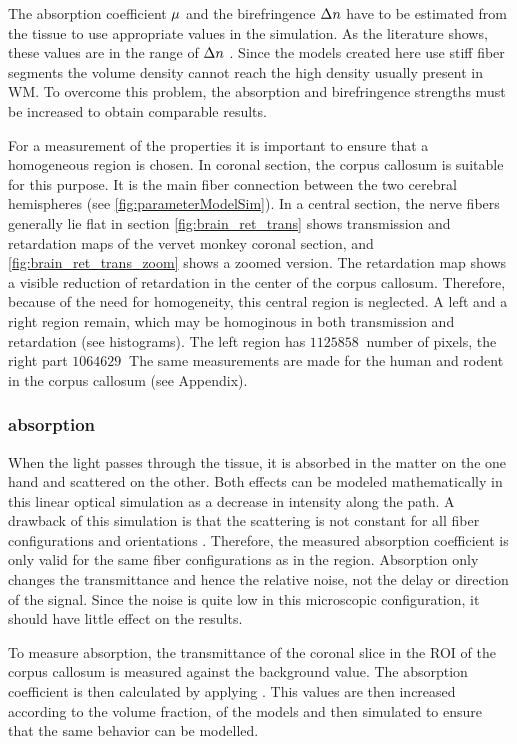 % 
The absorption coefficient $\textnormal{$\mu$}{}$ and the birefringence $\textnormal{$\Delta n$}{}$ have to be estimated from the tissue to use appropriate values in the simulation.
As the literature shows, these values are in the range of $\textnormal{$\Delta n$}{}$ \dummy{}.
Since the models created here use stiff fiber segments the volume density cannot reach the high density usually present in \ac{WM}.
To overcome this problem, the absorption and birefringence strengths must be increased to obtain comparable results.
\par
%
For a measurement of the properties it is important to ensure that a homogeneous region is chosen.
In coronal section, the corpus callosum is suitable for this purpose. It is the main fiber connection between the two cerebral hemispheres (see \cref{fig:parameterModelSim}). In a central section, the nerve fibers generally lie flat in section
% 
\ref{fig:brain_ret_trans} shows transmission and retardation maps of the vervet monkey coronal section, and \ref{fig:brain_ret_trans_zoom} shows a zoomed version.
The retardation map shows a visible reduction of retardation in the center of the corpus callosum.
Therefore, because of the need for homogeneity, this central region is neglected.
A left and a right region remain, which may be homoginous in both transmission and retardation (see histograms).
The left region has $\SI{1125858}{}$ number of pixels, the right part $\SI{1064629}{}$
% 
The same measurements are made for the human and rodent in the corpus callosum (see Appendix). 
% 
% 
% 
\subsubsection{absorption}
% 
When the light passes through the tissue, it is absorbed in the matter on the one hand and scattered on the other.
Both effects can be modeled mathematically in this linear optical simulation as a decrease in intensity along the path.
A drawback of this simulation is that the scattering is not constant for all fiber configurations and orientations \dummy[see MM]{}.
Therefore, the measured absorption coefficient is only valid for the same fiber configurations as in the region.
Absorption only changes the transmittance and hence the relative noise, not the delay or direction of the signal. 
Since the noise is quite low in this microscopic configuration, it should have little effect on the results. 
\par
% 
To measure absorption, the transmittance of the coronal slice in the \ac{ROI} of the corpus callosum is measured against the background value.
The absorption coefficient is then calculated by applying \dummy{}.
This values are then increased according to the volume fraction, of the models and then simulated to ensure that the same behavior can be modelled.
% 
